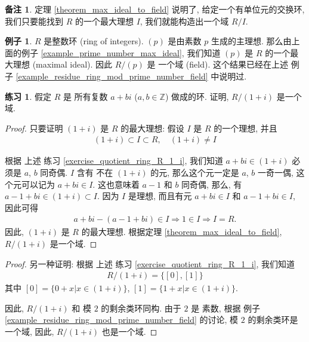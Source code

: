 \documentclass[utf8]{ctexbook}
\theoremstyle{definition}
\newtheorem{memo}{备注}[section]
\newtheorem{example}{例子}[section]
\newtheorem{exercise}{练习}[section]
\begin{document}
\begin{memo}
定理 \ref{theorem_max_ideal_to_field} 说明了, 给定一个有单位元的交换环, 我们只要能找到 $R$ 的一个最大理想 $I$, 我们就能构造出一个域 $R/I$.
\end{memo}

\begin{example}
$R$ 是整数环 (ring of integers). $(p)$ 是由素数 $p$ 生成的主理想. 那么由上面的例子 \ref{example_prime_number_max_ideal}, 我们知道 $(p)$ 是 $R$ 的一个最大理想 (maximal ideal). 因此 $R/(p)$ 是 一个域 (field). 这个结果已经在上述 例子 \ref{example_residue_ring_mod_prime_number_field} 中说明过.
\end{example}

\begin{exercise}
假定 $R$ 是 所有复数 $a+bi$ ($a,b \in \mathbb{Z}$) 做成的环. 证明, $R/ (1+i)$ 是一个域.
\end{exercise}

\begin{proof}
只要证明 $(1+i)$ 是 $R$ 的最大理想: 假设 $I$ 是 $R$ 的一个理想, 并且
\begin{align*}
(1+i) \subset I \subset R, \quad  (1+i) \neq I
\end{align*}

根据 上述 练习 \ref{exercise_quotient_ring_R_1_i}, 我们知道 $a+bi \in (1+i)$ 必须是 $a$, $b$ 同奇偶. $I$ 含有 不在 $(1+i)$ 的元, 那么这个元一定是 $a$, $b$ 一奇一偶, 这个元可以记为 $a + bi \in I$. 这也意味着 $a-1 $ 和 $b$ 同奇偶, 那么, 有 $a - 1 + b i \in (1+i) \subset I $. 因为 $I$ 是理想, 而且有元 $a + bi \in I$ 和 $a -1 + bi \in I$, 因此可得
\begin{align*}
a + bi - (a-1 +bi) \in I \Longrightarrow 1 \in I \Longrightarrow I = R.
\end{align*}
因此, $(1+i)$ 是 $R$ 的最大理想. 根据定理 \ref{theorem_max_ideal_to_field}, $R/(1+i)$ 是一个域.
\end{proof}

\begin{proof}
另一种证明: 根据 上述 练习 \ref{exercise_quotient_ring_R_1_i}, 我们知道 
\begin{align*}
R/(1+i) = \{ [0], [1] \}
\end{align*}
其中 $[0] = \{0 + x| x \in (1+i)\}$, $[1] = \{1 + x| x \in (1+i)\}$. 

因此, $R/(1+i)$ 和 模 $2$ 的剩余类环同构. 由于 $2$ 是 素数, 根据 例子 \ref{example_residue_ring_mod_prime_number_field} 的讨论, 模 $2$ 的剩余类环是一个域, 因此, $R/(1+i)$ 也是一个域.
\end{proof}
\end{document}
